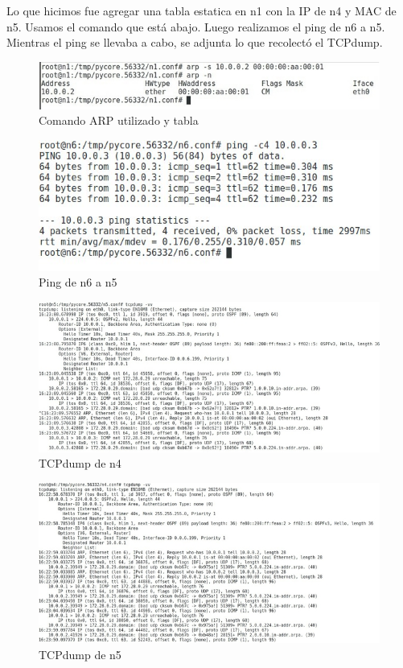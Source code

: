 \documentclass[a4paper,11pt]{article} %
\begin{document}
    Lo que hicimos fue agregar una tabla estatica en n1 con la IP de n4 y MAC de n5. Usamos el comando que está abajo. Luego realizamos el ping de n6 a n5. Mientras el ping se llevaba a cabo, se adjunta lo que recolectó el TCPdump.

    \begin{figure}[htbp]
        \centering
        \includegraphics[]{imgs/comando_arp.png}
        \caption{Comando ARP utilizado y tabla}
        \label{fig:comando_arp}
    \end{figure}

    \begin{figure}[htbp]
        \centering
        \includegraphics[]{imgs/ping_n6_n5.jpg}
        \caption{Ping de n6 a n5}
        \label{fig:ping_n6_n5}
    \end{figure}

    \begin{figure}[htbp]
        \centering
        \includegraphics[]{imgs/tcpdump_n4.png}
        \caption{TCPdump de n4}
        \label{fig:tcpdump_n4}
    \end{figure}

    \begin{figure}[htbp]
        \centering
        \includegraphics[]{imgs/tcpdump_n5.png}
        \caption{TCPdump de n5}
        \label{fig:tcpdump_n5}
    \end{figure}
\end{document}
